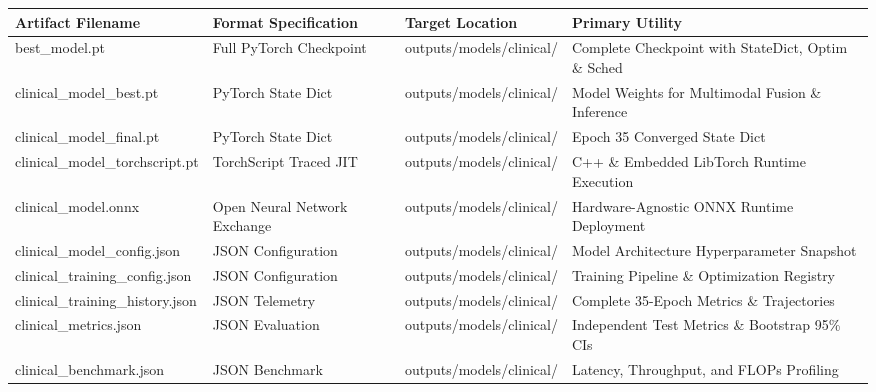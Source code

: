 \begin{tabular}{llll}
\toprule
Artifact Filename & Format Specification & Target Location & Primary Utility \\
\midrule
best\_model.pt & Full PyTorch Checkpoint & outputs/models/clinical/ & Complete Checkpoint with StateDict, Optim \& Sched \\
clinical\_model\_best.pt & PyTorch State Dict & outputs/models/clinical/ & Model Weights for Multimodal Fusion \& Inference \\
clinical\_model\_final.pt & PyTorch State Dict & outputs/models/clinical/ & Epoch 35 Converged State Dict \\
clinical\_model\_torchscript.pt & TorchScript Traced JIT & outputs/models/clinical/ & C++ \& Embedded LibTorch Runtime Execution \\
clinical\_model.onnx & Open Neural Network Exchange & outputs/models/clinical/ & Hardware-Agnostic ONNX Runtime Deployment \\
clinical\_model\_config.json & JSON Configuration & outputs/models/clinical/ & Model Architecture Hyperparameter Snapshot \\
clinical\_training\_config.json & JSON Configuration & outputs/models/clinical/ & Training Pipeline \& Optimization Registry \\
clinical\_training\_history.json & JSON Telemetry & outputs/models/clinical/ & Complete 35-Epoch Metrics \& Trajectories \\
clinical\_metrics.json & JSON Evaluation & outputs/models/clinical/ & Independent Test Metrics \& Bootstrap 95\% CIs \\
clinical\_benchmark.json & JSON Benchmark & outputs/models/clinical/ & Latency, Throughput, and FLOPs Profiling \\
\bottomrule
\end{tabular}
